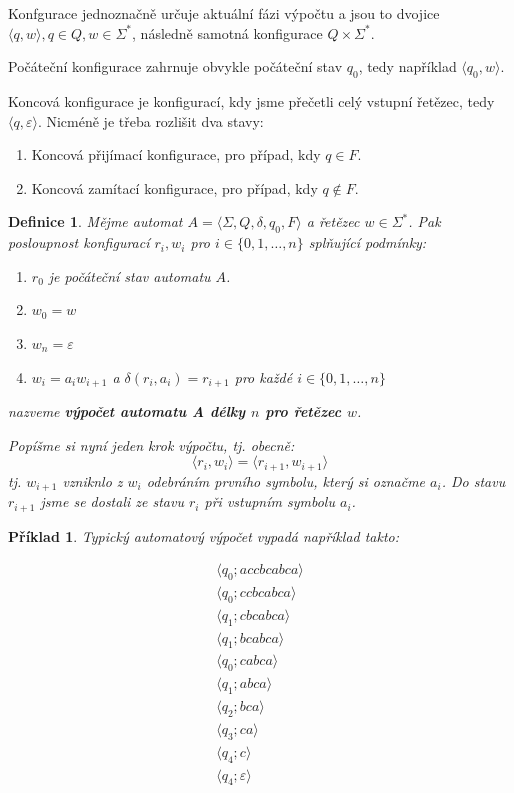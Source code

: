 \documentclass[10pt, a4paper, titlepage]{article}
\theoremstyle{note}
\newtheorem{definice}{Definice}
\newtheorem{priklad}{Příklad}
\begin{document}
Konfgurace jednoznačně určuje aktuální fázi výpočtu a jsou to dvojice $\langle q, w \rangle, q \in Q, w \in \Sigma^*$, následně
samotná konfigurace $Q \times \Sigma^*$.

Počáteční konfigurace zahrnuje obvykle počáteční stav $q_0$, tedy například $\langle q_0, w \rangle$.

Koncová konfigurace je konfigurací, kdy jsme přečetli celý vstupní řetězec,
tedy $\langle q, \varepsilon \rangle$. Nicméně je třeba rozlišit dva stavy:
\begin{enumerate}
\item
Koncová přijímací konfigurace, pro případ, kdy $q \in F$.

\item
Koncová zamítací konfigurace, pro případ, kdy $q \notin F$.
\end{enumerate}

\begin{definice}
Mějme automat $A = \langle \Sigma, Q, \delta, q_0, F \rangle$ a řetězec $w \in \Sigma^*$. Pak posloupnost
konfigurací $r_i, w_i$ pro $i \in \lbrace 0, 1, \ldots, n \rbrace$ splňující podmínky:
\begin{enumerate}
\item
$r_0$ je počáteční stav automatu $A$.

\item
$w_0 = w$

\item
$w_n = \varepsilon$

\item \label{vypocet-bod-4}
$w_i = a_i w_{i+1}$ a $\delta(r_i, a_i) = r_{i+1}$ pro každé $i \in \lbrace 0,1,\ldots,n \rbrace$
\end{enumerate}
nazveme \textbf{výpočet automatu A délky $n$ pro řetězec $w$}.

Popíšme si nyní jeden krok výpočtu, tj. obecně:
$$
\langle r_i, w_i \rangle = \langle r_{i+1}, w_{i+1} \rangle
$$
tj. $w_{i+1}$ vzniknlo z $w_i$ odebráním prvního symbolu, který si označme $a_i$. Do stavu $r_{i+1}$ jsme se dostali ze
stavu $r_i$ při vstupním symbolu $a_i$.
\end{definice}

\newpage
\begin{priklad}
Typický automatový výpočet vypadá například takto:

\begin{gather*}
\langle q_0 ; accbcabca \rangle \\
\langle q_0 ; ccbcabca \rangle \\
\langle q_1 ; cbcabca \rangle \\
\langle q_1 ; bcabca \rangle \\
\langle q_0 ; cabca \rangle \\
\langle q_1 ; abca \rangle \\
\langle q_2 ; bca \rangle \\
\langle q_3 ; ca \rangle \\
\langle q_4 ; c \rangle \\
\langle q_4 ; \varepsilon \rangle \\
\end{gather*}
\end{priklad}
\end{document}
